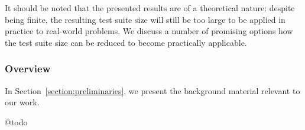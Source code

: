 It should be noted that the presented results are of a theoretical nature: despite being finite, the resulting test suite size will still be too large to be applied in practice to real-world problems.
We discuss a number of promising options how the test suite size can be reduced to become practically applicable.
 

\subsubsection*{Overview}
In Section~\ref{section:preliminaries}, 
we present the background material relevant to our work.

@todo


